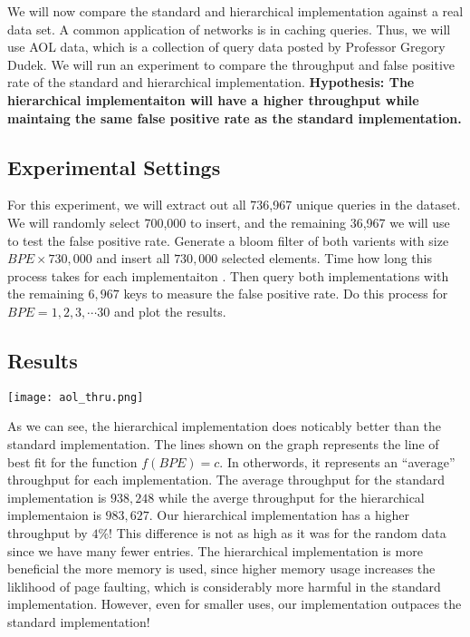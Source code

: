We will now compare the standard and hierarchical implementation against a real data set.
A common application of networks is in caching queries. Thus, we will use AOL data, which is a collection of query data \cite{AOL} posted by Professor Gregory Dudek.
We will run an experiment to compare the throughput and false positive rate of the standard and hierarchical implementation.
\textbf{Hypothesis: The hierarchical implementaiton will have a higher throughput while maintaing the same false positive rate as the standard implementation.}
\subsection{Experimental Settings}
For this experiment, we will extract out all 736,967 unique queries in the dataset.
We will randomly select 700,000 to insert, and the remaining 36,967 we will use to test the false positive rate.
Generate a bloom filter of both varients with size $BPE\times 730,000$ and insert all $730,000$ selected elements.
Time how long this process takes for each implementaiton . Then query both implementations with the remaining $6,967$ keys to measure the false positive rate.
Do this process for $BPE = 1, 2, 3, \cdots 30$ and plot the results.

\subsection{Results}
\begin{center}
    \texttt{[image: aol\_thru.png]}
\end{center}

As we can see, the hierarchical implementation does noticably better than the standard implementation. 
The lines shown on the graph represents the line of best fit for the function $f(BPE) = c$. In otherwords, it represents an ``average'' throughput for each implementation.
The average throughput for the standard implementation is $938,248$ while the averge throughput for the hierarchical implementaion is $983,627$.
Our hierarchical implementation has a higher throughput by $4\%$! This difference is not as high as it was for the random data since we have many fewer entries.
The hierarchical implementation is more beneficial the more memory is used, since higher memory usage increases the liklihood of page faulting, which is considerably more harmful in the standard implementation.
However, even for smaller uses, our implementation outpaces the standard implementation!

